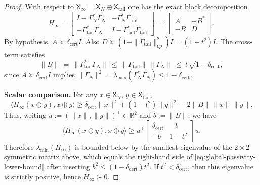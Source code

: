 \documentclass[11pt]{article}
\theoremstyle{definition}
\theoremstyle{remark}
\theoremstyle{definition}
\begin{document}
\begin{proof}
With respect to $\mathsf X_\infty=\mathsf X_N\oplus \mathsf X_{\mathrm{tail}}$ one has the exact block decomposition
\[
  H_\infty
  =\begin{bmatrix}
    I-\Gamma_N^*\Gamma_N & -\Gamma_N^*\Gamma_{\mathrm{tail}}\\
    -\Gamma_{\mathrm{tail}}^*\Gamma_N & I-\Gamma_{\mathrm{tail}}^*\Gamma_{\mathrm{tail}}
  \end{bmatrix}
  =:\begin{bmatrix}A & -B^*\\ -B & D\end{bmatrix}.
\]
By hypothesis, $A\succeq \delta_{\mathrm{cert}} I$.
Also $D\succeq (1-\|\Gamma_{\mathrm{tail}}\|_{op}^2)I=(1-t^2)I$.
The cross-term satisfies
\[
  \|B\|\ =\ \|\Gamma_{\mathrm{tail}}^*\Gamma_N\|\ \le\ \|\Gamma_{\mathrm{tail}}\|\,\|\Gamma_N\|
  \ \le\ t\,\sqrt{1-\delta_{\mathrm{cert}}},
\]
since $A\succeq \delta_{\mathrm{cert}}I$ implies $\|\Gamma_N\|^2=\lambda_{\max}(\Gamma_N^*\Gamma_N)\le 1-\delta_{\mathrm{cert}}$.

\smallskip
\noindent\textbf{Scalar comparison.}
For any $x\in\mathsf X_N$, $y\in\mathsf X_{\mathrm{tail}}$,
\[
  \langle H_\infty(x\oplus y),x\oplus y\rangle
  \ge \delta_{\mathrm{cert}}\|x\|^2 + (1-t^2)\|y\|^2 - 2\|B\|\,\|x\|\,\|y\|.
\]
Thus, writing $u:=(\|x\|,\|y\|)^\top\in\mathbb R^2$ and $b:=\|B\|$, we have
\[
  \langle H_\infty(x\oplus y),x\oplus y\rangle
  \ge u^\top
  \begin{bmatrix}\delta_{\mathrm{cert}} & -b\\ -b & 1-t^2\end{bmatrix}
  u.
\]
Therefore $\lambda_{\min}(H_\infty)$ is bounded below by the smallest eigenvalue of the $2\times2$ symmetric matrix above, which equals the right-hand side of \eqref{eq:global-passivity-lower-bound} after inserting $b^2\le (1-\delta_{\mathrm{cert}})t^2$.
If $t^2<\delta_{\mathrm{cert}}$, then this eigenvalue is strictly positive, hence $H_\infty\succ 0$.
\end{proof}
\end{document}
